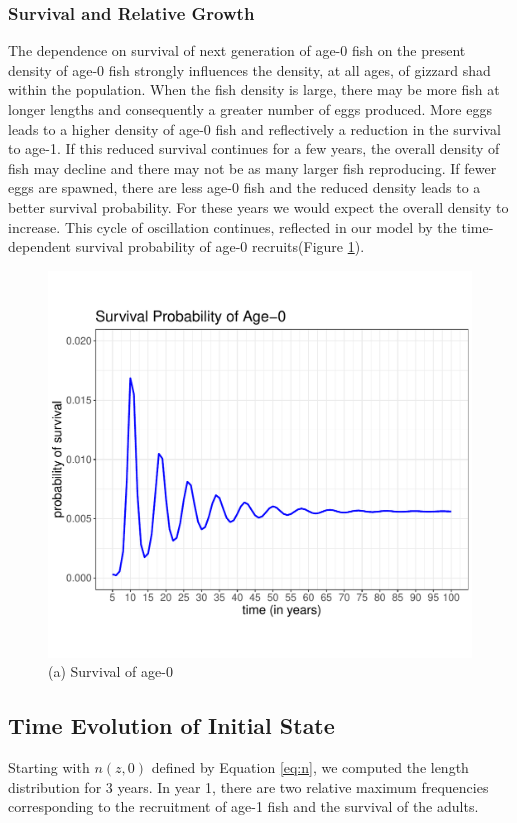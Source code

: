 \documentclass[preprint,review,12pt,authoryear]{elsarticle}
\begin{document}
\subsubsection{Survival and Relative Growth}
The dependence on survival of next generation of age-0 fish on the present density of age-0 fish strongly influences the density, at all ages, of gizzard shad within the population. 
When the fish density is large, there may be more fish at longer lengths and consequently a greater number of eggs produced.  
More eggs leads to a higher density of age-0 fish and reflectively a reduction in the survival to age-1.  
If this reduced survival continues for a few years, the overall density of fish may decline and there may not be as many larger fish reproducing.  
If fewer eggs are spawned, there are less age-0 fish and the reduced density leads to a better survival probability.  
For these years we would expect the overall density to increase.  
This cycle of oscillation continues, reflected in our model by the time-dependent survival probability of age-0 recruits(Figure \ref{fig:age0time}).

\begin{figure}
\centering
  \includegraphics[width=.4\textwidth]{figures/Figure2a.pdf}
   \caption{}
  \label{fig:age0time}
\caption{(a) Survival of age-0}
\end{figure}    

\subsection{Time Evolution of Initial State}
Starting with $n(z,0)$ defined by Equation \ref{eq:n}, we computed the length distribution for 3 years.  
In year 1, there are two relative maximum frequencies corresponding to the recruitment of age-1 fish and the survival of the adults.
\end{document}
